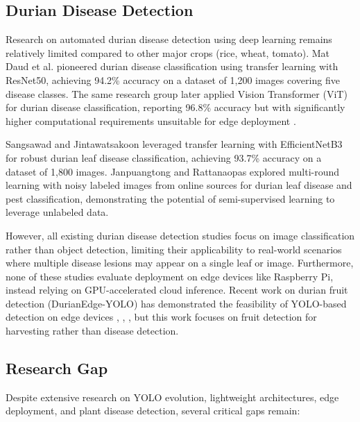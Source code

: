 \subsection{Durian Disease Detection}

Research on automated durian disease detection using deep learning remains relatively limited compared to other major crops (rice, wheat, tomato). Mat Daud et al. \cite{50} pioneered durian disease classification using transfer learning with ResNet50, achieving 94.2\% accuracy on a dataset of 1,200 images covering five disease classes. The same research group later applied Vision Transformer (ViT) for durian disease classification, reporting 96.8\% accuracy but with significantly higher computational requirements unsuitable for edge deployment \cite{52}.

Sangsawad and Jintawatsakoon \cite{51} leveraged transfer learning with EfficientNetB3 for robust durian leaf disease classification, achieving 93.7\% accuracy on a dataset of 1,800 images. Janpuangtong and Rattanaopas \cite{53} explored multi-round learning with noisy labeled images from online sources for durian leaf disease and pest classification, demonstrating the potential of semi-supervised learning to leverage unlabeled data.

However, all existing durian disease detection studies focus on image classification rather than object detection, limiting their applicability to real-world scenarios where multiple disease lesions may appear on a single leaf or image. Furthermore, none of these studies evaluate deployment on edge devices like Raspberry Pi, instead relying on GPU-accelerated cloud inference. Recent work on durian fruit detection (DurianEdge-YOLO) has demonstrated the feasibility of YOLO-based detection on edge devices \cite{19}, \cite{48}, \cite{67}, but this work focuses on fruit detection for harvesting rather than disease detection.

\subsection{Research Gap}

Despite extensive research on YOLO evolution, lightweight architectures, edge deployment, and plant disease detection, several critical gaps remain:

